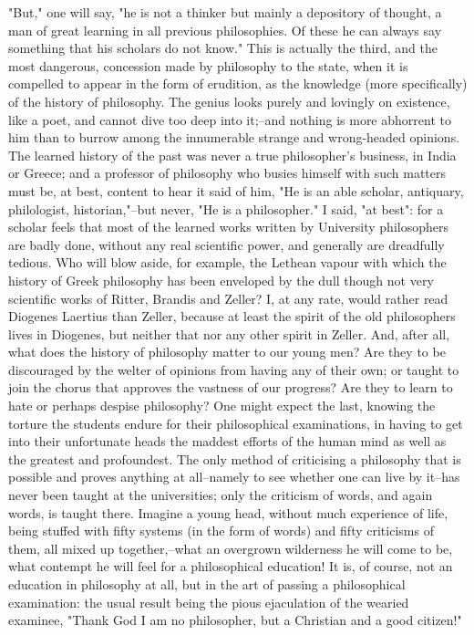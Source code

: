 "But," one will say, "he is not a thinker but mainly a depository of
thought, a man of great learning in all previous philosophies. Of
these he can always say something that his scholars do not know."
This is actually the third, and the most dangerous, concession made
by philosophy to the state, when it is compelled to appear in the
form of erudition, as the knowledge (more specifically) of the
history of philosophy. The genius looks purely and lovingly on
existence, like a poet, and cannot dive too deep into it;--and
nothing is more abhorrent to him than to burrow among the innumerable
strange and wrong-headed opinions. The learned history of the past
was never a true philosopher's business, in India or Greece; and a
professor of philosophy who busies himself with such matters must be,
at best, content to hear it said of him, "He is an able scholar,
antiquary, philologist, historian,"--but never, "He is a
philosopher." I said, "at best": for a scholar feels that most of the
learned works written by University philosophers are badly done,
without any real scientific power, and generally are dreadfully
tedious. Who will blow aside, for example, the Lethean vapour with
which the history of Greek philosophy has been enveloped by the dull
though not very scientific works of Ritter, Brandis and Zeller? I, at
any rate, would rather read Diogenes Laertius than Zeller, because at
least the spirit of the old philosophers lives in Diogenes, but
neither that nor any other spirit in Zeller. And, after all, what
does the history of philosophy matter to our young men? Are they to
be discouraged by the welter of opinions from having any of their
own; or taught to join the chorus that approves the vastness of our
progress? Are they to learn to hate or perhaps despise philosophy?
One might expect the last, knowing the torture the students endure
for their philosophical examinations, in having to get into their
unfortunate heads the maddest efforts of the human mind as well as
the greatest and profoundest. The only method of criticising a
philosophy that is possible and proves anything at all--namely to see
whether one can live by it--has never been taught at the
universities; only the criticism of words, and again words, is taught
there. Imagine a young head, without much experience of life, being
stuffed with fifty systems (in the form of words) and fifty
criticisms of them, all mixed up together,--what an overgrown
wilderness he will come to be, what contempt he will feel for a
philosophical education! It is, of course, not an education in
philosophy at all, but in the art of passing a philosophical
examination: the usual result being the pious ejaculation of the
wearied examinee, "Thank God I am no philosopher, but a Christian and
a good citizen!"

